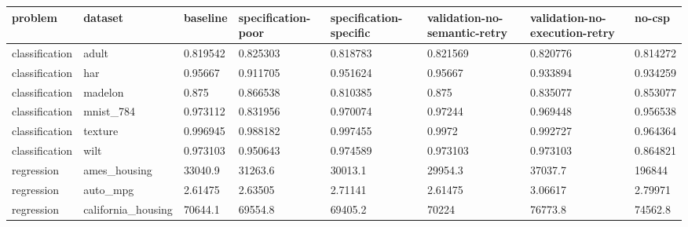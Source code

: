 \begin{tabular}{llllllll}
\hline
problem & dataset & baseline & specification-poor & specification-specific & validation-no-semantic-retry & validation-no-execution-retry & no-csp \\
\hline
classification & adult & 0.819542 & 0.825303 & 0.818783 & 0.821569 & 0.820776 & 0.814272 \\
classification & har & 0.95667 & 0.911705 & 0.951624 & 0.95667 & 0.933894 & 0.934259 \\
classification & madelon & 0.875 & 0.866538 & 0.810385 & 0.875 & 0.835077 & 0.853077 \\
classification & mnist\_784 & 0.973112 & 0.831956 & 0.970074 & 0.97244 & 0.969448 & 0.956538 \\
classification & texture & 0.996945 & 0.988182 & 0.997455 & 0.9972 & 0.992727 & 0.964364 \\
classification & wilt & 0.973103 & 0.950643 & 0.974589 & 0.973103 & 0.973103 & 0.864821 \\
regression & ames\_housing & 33040.9 & 31263.6 & 30013.1 & 29954.3 & 37037.7 & 196844 \\
regression & auto\_mpg & 2.61475 & 2.63505 & 2.71141 & 2.61475 & 3.06617 & 2.79971 \\
regression & california\_housing & 70644.1 & 69554.8 & 69405.2 & 70224 & 76773.8 & 74562.8 \\
\hline
\end{tabular}
